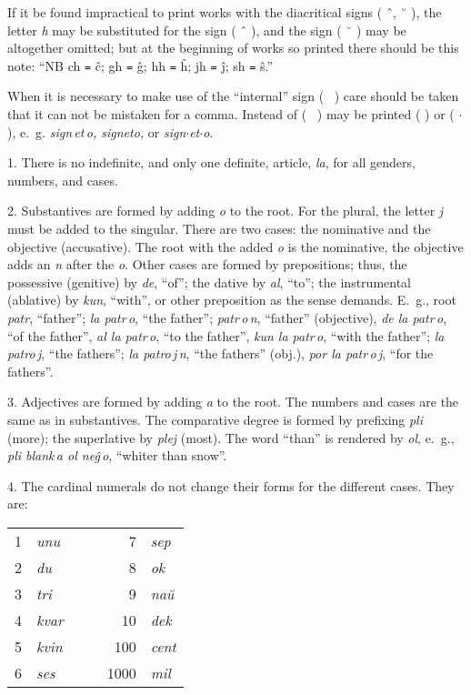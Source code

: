\newpage
{}
If it be found impractical to print works with the diacritical signs ( ˆ, ˘ ), the letter \emph{h} may be substituted for the sign ( ˆ ), and the sign ( ˘ ) may be altogether omitted; but at the beginning of works so printed there should be this note: ``NB ch \texttt{=} ĉ; gh \texttt{=} ĝ; hh \texttt{=} ĥ; jh \texttt{=} ĵ; sh \texttt{=} ŝ.''

When it is necessary to make use of the ``internal'' sign ( \, ) care should be taken that it can not be mistaken for a comma.  Instead of ( \, ) may be printed ( \textquotesingle{} ) or ( $\cdot$ ), e.~g. \emph{sign\,et\,o, sign\textquotesingle{}et\textquotesingle{}o,} or \emph{sign$\cdot$et$\cdot$o}.

%
%

1. There is no indefinite, and only one definite, article, \emph{la}, for all genders, numbers, and cases.

2. Substantives are formed by adding \emph{o} to the root. For the plural, the letter \emph{j} must be added to the singular. There are two cases: the nominative and the objective (accusative). The root with the added \emph{o} is the nominative, the objective adds an \emph{n} after the \emph{o}. Other cases are formed by prepositions; thus, the possessive (genitive) by \emph{de}, “of”; the dative by \emph{al}, “to”; the instrumental (ablative) by \emph{kun}, “with”, or other preposition as the sense demands. E.~g., root \emph{patr}, “father”; \emph{la patr\,o}, “the father”; \emph{patr\,o\,n}, “father” (objective), \emph{de la patr\,o}, “of the father”, \emph{al la patr\,o}, “to the father”, \emph{kun la patr\,o}, “with the father”; \emph{la patro\,j}, “the fathers”; \emph{la patro\,j\,n}, “the fathers” (obj.), \emph{por la patr\,o\,j}, “for the fathers”.

3. Adjectives are formed by adding \emph{a} to the root. The numbers and cases are the same as in substantives. The comparative degree is formed by prefixing \emph{pli} (more); the superlative by \emph{plej} (most). The word “than” is rendered by \emph{ol}, e.~g., \emph{pli blank\,a ol neĝ\,o}, “whiter than snow”.

4. The cardinal numerals do not change their forms for the different cases. They are:

\begin{center}
\begin{tabular}{rlccrl}
1 & \emph{unu} & \hspace{2em} & \hspace{2em} & 7 & \emph{sep} \\
2 & \emph{du} & & & 8 & \emph{ok} \\
3 & \emph{tri} & & & 9 & \emph{naŭ} \\
4 & \emph{kvar} & & & 10 & \emph{dek} \\
5 & \emph{kvin} & & & 100 & \emph{cent} \\
6 & \emph{ses} & & & 1000 & \emph{mil} 
\end{tabular}
\end{center}

